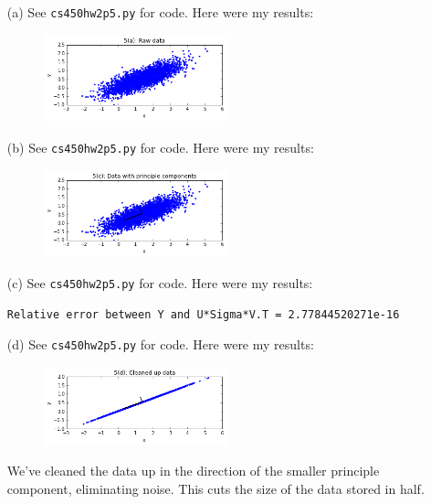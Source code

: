 \documentclass[10pt]{article}
\begin{document}

\begin{enumerate}

\item[(a)] See \verb+cs450hw2p5.py+ for code. Here were my results:

\begin{figure}[H]
  \centering
    \includegraphics[width=0.5\textwidth]{p5fig1}
\end{figure}

\item[(b)] See \verb+cs450hw2p5.py+ for code. Here were my results:

\begin{figure}[H]
  \centering
    \includegraphics[width=0.5\textwidth]{p5fig2}
\end{figure}

\item[(c)] See \verb+cs450hw2p5.py+ for code. Here were my results:

\begin{verbatim}
Relative error between Y and U*Sigma*V.T = 2.77844520271e-16
\end{verbatim}

\item[(d)] See \verb+cs450hw2p5.py+ for code. Here were my results:

\begin{figure}[H]
  \centering
    \includegraphics[width=0.5\textwidth]{p5fig3}
\end{figure}

We've cleaned the data up in the direction of the smaller principle component, eliminating noise. This cuts the size of the data stored in half.

\end{enumerate}
\end{document}
